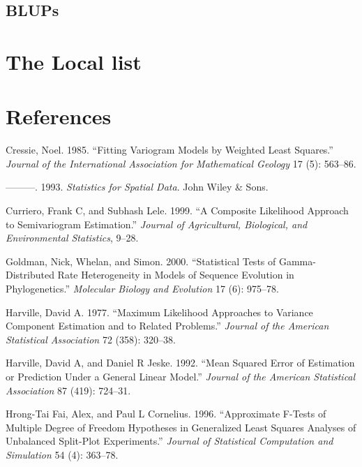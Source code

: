 \documentclass{article}
\begin{document}
\hypertarget{blups}{%
\subsection{BLUPs}\label{blups}}

\hypertarget{the-local-list}{%
\section{The Local list}\label{the-local-list}}

\hypertarget{references}{%
\section*{References}\label{references}}

\hypertarget{refs}{}
\leavevmode\hypertarget{ref-cressie1985fitting}{}%
Cressie, Noel. 1985. ``Fitting Variogram Models by Weighted Least
Squares.'' \emph{Journal of the International Association for
Mathematical Geology} 17 (5): 563--86.

\leavevmode\hypertarget{ref-cressie1993statistics}{}%
---------. 1993. \emph{Statistics for Spatial Data}. John Wiley \& Sons.

\leavevmode\hypertarget{ref-curriero1999composite}{}%
Curriero, Frank C, and Subhash Lele. 1999. ``A Composite Likelihood
Approach to Semivariogram Estimation.'' \emph{Journal of Agricultural,
Biological, and Environmental Statistics}, 9--28.

\leavevmode\hypertarget{ref-goldman2000statistical}{}%
Goldman, Nick, Whelan, and Simon. 2000. ``Statistical Tests of
Gamma-Distributed Rate Heterogeneity in Models of Sequence Evolution in
Phylogenetics.'' \emph{Molecular Biology and Evolution} 17 (6): 975--78.

\leavevmode\hypertarget{ref-harville1977maximum}{}%
Harville, David A. 1977. ``Maximum Likelihood Approaches to Variance
Component Estimation and to Related Problems.'' \emph{Journal of the
American Statistical Association} 72 (358): 320--38.

\leavevmode\hypertarget{ref-harville1992mean}{}%
Harville, David A, and Daniel R Jeske. 1992. ``Mean Squared Error of
Estimation or Prediction Under a General Linear Model.'' \emph{Journal
of the American Statistical Association} 87 (419): 724--31.

\leavevmode\hypertarget{ref-hrong1996approximate}{}%
Hrong-Tai Fai, Alex, and Paul L Cornelius. 1996. ``Approximate F-Tests
of Multiple Degree of Freedom Hypotheses in Generalized Least Squares
Analyses of Unbalanced Split-Plot Experiments.'' \emph{Journal of
Statistical Computation and Simulation} 54 (4): 363--78.
\end{document}

